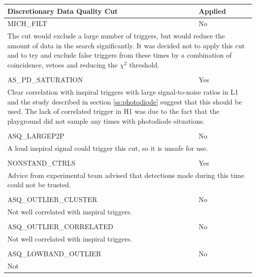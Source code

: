 \begin{table}[p]
\label{t:s2dqchoice}
\begin{center}
\begin{tabular}{ll}
Discretionary Data Quality Cut  & Applied \\\hline\hline
MICH\_FILT                 & No \\
\multicolumn{2}{l}{\parbox{\linewidth}{\footnotesize The cut would exclude a
large number of triggers, but would reduce the amount of data in the search
significantly. It was decided not to apply this cut and to try and exclude
false triggers from these times by a combination of coincidence, vetoes and
reducing the $\chi^2$ threshold.}}\\
\\
AS\_PD\_SATURATION        & Yes \\
\multicolumn{2}{l}{\parbox{\linewidth}{\footnotesize Clear correlation with
inspiral triggers with large signal-to-noise ratios in L1 and the study
described in section \ref{ss:photodiode} suggest that this should be used. The
lack of correlated trigger in H1 was due to the fact that the playground did
not sample any times with photodiode situations.\baselineskip=14pt}}\\
\\
ASQ\_LARGEP2P             & No \\
\multicolumn{2}{l}{\parbox{\linewidth}{\footnotesize A loud inspiral signal
could trigger this cut, so it is unsafe for use.\baselineskip=14pt}} \\
\\
NONSTAND\_CTRLS           & Yes \\
\multicolumn{2}{l}{\parbox{\linewidth}{\footnotesize Advice from experimental
team advised that detections made during this time could not be
trusted.\baselineskip=14pt}} \\
\\
ASQ\_OUTLIER\_CLUSTER     & No \\
\multicolumn{2}{l}{\parbox{\linewidth}{\footnotesize Not 
well correlated with inspiral triggers. \baselineskip=14pt}} \\
\\
ASQ\_OUTLIER\_CORRELATED  & No \\
\multicolumn{2}{l}{\parbox{\linewidth}{\footnotesize Not 
well correlated with inspiral triggers.\baselineskip=14pt}} \\
\\
ASQ\_LOWBAND\_OUTLIER     & No \\
\multicolumn{2}{l}{\parbox{\linewidth}{\footnotesize Not 
}}
\end{tabular}
\end{center}
\end{table}
